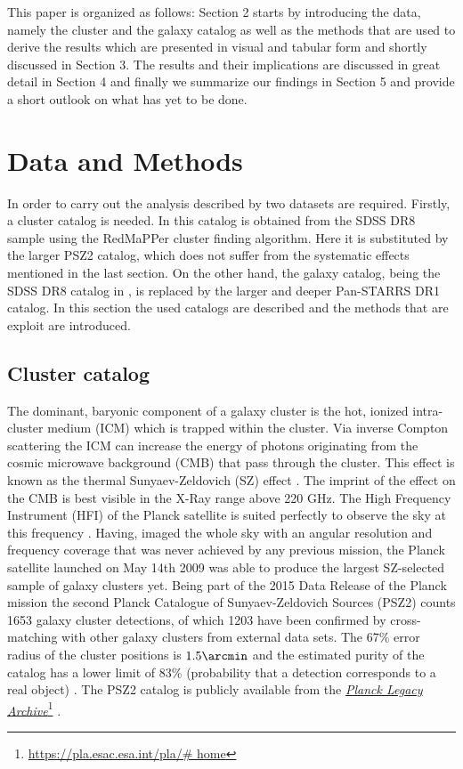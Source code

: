 \documentclass[a4paper,fleqn,usenatbib]{mnras}
\newcommand\fnurl[2]{%
  \href{#2}{#1}\footnote{\url{#2}}%
}
\begin{document}
This paper is organized as follows: Section 2 starts by introducing the data, namely the cluster and the galaxy catalog as well as the methods that are used to derive the results which are presented in visual and tabular form and shortly discussed in Section 3. The results and their implications are discussed in great detail in Section 4 and finally we summarize our findings in Section 5 and provide a short outlook on what has yet to be done.

\section{Data and Methods}
In order to carry out the analysis described by \citet{more2016detection} two datasets are required. Firstly, a cluster catalog is needed. In \citet{more2016detection} this catalog is obtained from the SDSS DR8 sample using the RedMaPPer cluster finding algorithm. Here it is substituted by the larger PSZ2 catalog, which does not suffer from the systematic effects mentioned in the last section. On the other hand, the galaxy catalog, being the SDSS DR8 catalog in \citet{more2016detection}, is replaced by the larger and deeper Pan-STARRS DR1 catalog. In this section the used catalogs are described and the methods that are exploit are introduced.

\subsection{Cluster catalog}
\label{sec:clusters}
The dominant, baryonic component of a galaxy cluster is the hot, ionized  intra-cluster medium (ICM) which is trapped within the cluster. Via inverse Compton scattering the ICM can increase the energy of photons originating from the cosmic microwave background (CMB) that pass through the cluster. This effect is known as the thermal Sunyaev-Zeldovich (SZ) effect \citep{sunyaev1970small,sunyaev1980velocity}. The imprint of the effect on the CMB is best visible in the X-Ray range above 220 GHz. The High Frequency Instrument (HFI) of the Planck satellite is suited perfectly to observe the sky at this frequency \citep{collaboration2016planck}. Having, imaged the whole sky with an angular resolution and frequency coverage that was never achieved by any previous mission, the Planck satellite launched on May 14th 2009 was able to produce the largest SZ-selected sample of galaxy clusters yet. Being part of the 2015 Data Release of the Planck mission the second Planck Catalogue of Sunyaev-Zeldovich Sources (PSZ2) counts 1653 galaxy cluster detections, of which 1203 have been confirmed by cross-matching with other galaxy clusters from external data sets. The 67\% error radius of the cluster positions is $1.5\arcmin$ and the estimated purity of the catalog has a lower limit of 83\% (probability that a detection corresponds to a real object) \citep{adam2016planck,collaboration2016planck}. The PSZ2 catalog is publicly available from the \fnurl{\textit{Planck Legacy Archive}}{https://pla.esac.esa.int/pla/\# home}. 
\end{document}
